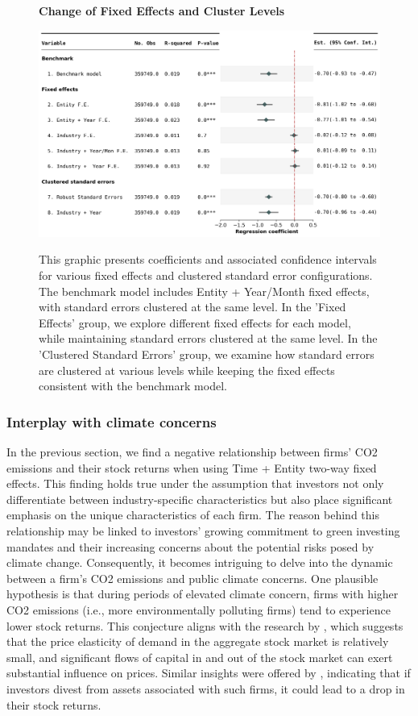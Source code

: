 \documentclass[12pt]{article}
\begin{document}
\begin{figure}[H]
\centering
\caption{\textbf{Change of Fixed Effects and Cluster Levels}}
\includegraphics[width=.8\textwidth]{graphics/forestplot.png}
\label{fig: forestplot}
\caption*{\footnotesize{This graphic presents coefficients and associated confidence intervals for various fixed effects and clustered standard error configurations. The benchmark model includes Entity + Year/Month fixed effects, with standard errors clustered at the same level. In the 'Fixed Effects' group, we explore different fixed effects for each model, while maintaining standard errors clustered at the same level. In the 'Clustered Standard Errors' group, we examine how standard errors are clustered at various levels while keeping the fixed effects consistent with the benchmark model.}}
\end{figure}

\subsubsection{Interplay with climate concerns}
In the previous section, we find a negative relationship between firms' CO2 emissions and their stock returns when using Time + Entity two-way fixed effects. This finding holds true under the assumption that investors not only differentiate between industry-specific characteristics but also place significant emphasis on the unique characteristics of each firm. The reason behind this relationship may be linked to investors' growing commitment to green investing mandates and their increasing concerns about the potential risks posed by climate change. Consequently, it becomes intriguing to delve into the dynamic between a firm's CO2 emissions and public climate concerns. One plausible hypothesis is that during periods of elevated climate concern, firms with higher CO2 emissions (i.e., more environmentally polluting firms) tend to experience lower stock returns. This conjecture aligns with the research by \cite{gabaix2021search}, which suggests that the price elasticity of demand in the aggregate stock market is relatively small, and significant flows of capital in and out of the stock market can exert substantial influence on prices. Similar insights were offered by \cite{koijen2019demand}, indicating that if investors divest from assets associated with such firms, it could lead to a drop in their stock returns.
\end{document}
